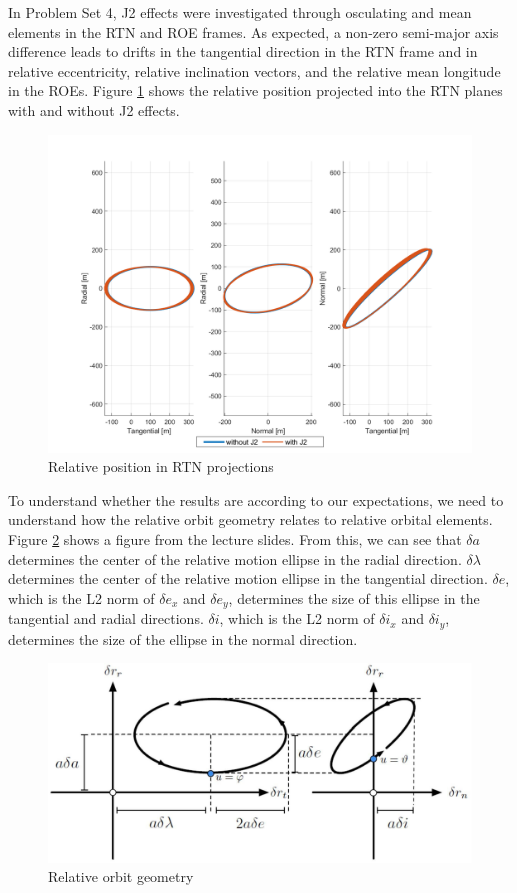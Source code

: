 In Problem Set 4, J2 effects were investigated through osculating and mean elements in the RTN and ROE frames. As expected, a non-zero semi-major axis difference leads to drifts in the tangential direction in the RTN frame and in relative eccentricity, relative inclination vectors, and the relative mean longitude in the ROEs. Figure \ref{fig:RTN_projections_summary} shows the relative position projected into the RTN planes with and without J2 effects.

\begin{figure}[H]
    \centering
    \includegraphics[width=0.75\linewidth]{sim/figures/PS4/RTN_projections_SV2.png}
    \caption{Relative position in RTN projections}
    \label{fig:RTN_projections_summary}
\end{figure}

To understand whether the results are according to our expectations, we need to understand how the relative orbit geometry relates to relative orbital elements. Figure \ref{fig:rel_geometry_summary} shows a figure from the lecture slides. From this, we can see that $\delta a$ determines the center of the relative motion ellipse in the radial direction. $\delta \lambda$ determines the center of the relative motion ellipse in the tangential direction. $\delta e$, which is the L2 norm of $\delta e_x$ and $\delta e_y$, determines the size of this ellipse in the tangential and radial directions. $\delta i$, which is the L2 norm of $\delta i_x$ and $\delta i_y$, determines the size of the ellipse in the normal direction. 

\begin{figure}[H]
    \centering
    \includegraphics[width=0.75\linewidth]{LaTeX/Figures/RelOrbitGeometry.jpg}
    \caption{Relative orbit geometry}
    \label{fig:rel_geometry_summary}
\end{figure}

